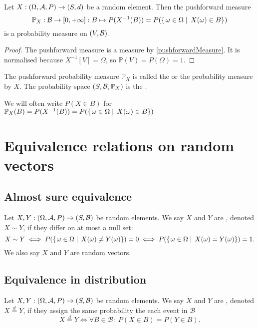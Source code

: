 \begin{lemma}
Let $X: \left( \Omega, \mathcal{A}, P \right) \to \left( S, d \right)$ be a random element. Then the pushforward measure
\[ \mathbb{P}_X: \mathcal{B}\to [0, +\infty]: B\mapsto P(X^{-1}(B)) = P(\left\{\left. \omega\in \Omega \;\right|\; X(\omega)\in B \right\}) \]
is a probability measure on $\left( V, \mathcal{B} \right)$.
\end{lemma}
\begin{proof}
The pushforward measure is a measure by \ref{pushforwardMeasure}.
It is normalised because $X^{-1}[V] = \Omega$, so $\mathbb{P}(V) = P(\Omega) = 1$.
\end{proof}

\begin{definition}
The pushforward probability measure $\mathbb{P}_X$ is called the  or the probability measure  by $X$. The probability space $\left( S, \mathcal{B}, \mathbb{P}_X \right)$ is the .
\end{definition}

We will often write $P(X\in B)$ for $\mathbb{P}_X(B) = P(X^{-1}(B)) = P(\left\{\left. \omega\in \Omega \;\right|\; X(\omega)\in B \right\})$

\section{Equivalence relations on random vectors}
\subsection{Almost sure equivalence}
\begin{definition}
Let $X, Y: \left( \Omega, \mathcal{A}, P \right) \to \left( S, \mathcal{B} \right)$ be random elements. We say $X$ and $Y$ are , denoted $X\sim Y$, if they differ on at most a null set:
\[ X\sim Y \iff P(\left\{\left. \omega\in \Omega \;\right|\; X(\omega) \neq Y(\omega) \right\}) = 0 \iff P(\left\{\left. \omega\in \Omega \;\right|\; X(\omega) = Y(\omega) \right\}) = 1. \]
We also say $X$ and $Y$ are  random vectors.
\end{definition}

\subsection{Equivalence in distribution}
\begin{definition}
Let $X, Y: \left( \Omega, \mathcal{A}, P \right) \to \left( S, \mathcal{B} \right)$ be random elements. We say $X$ and $Y$ are , denoted $X \overset{d}{=} Y$, if they assign the same probability the each event in $\mathcal{B}$
\[ X \overset{d}{=} Y \iff \forall B\in\mathcal{B}: \; P(X\in B) = P(Y\in B). \]
\end{definition}

